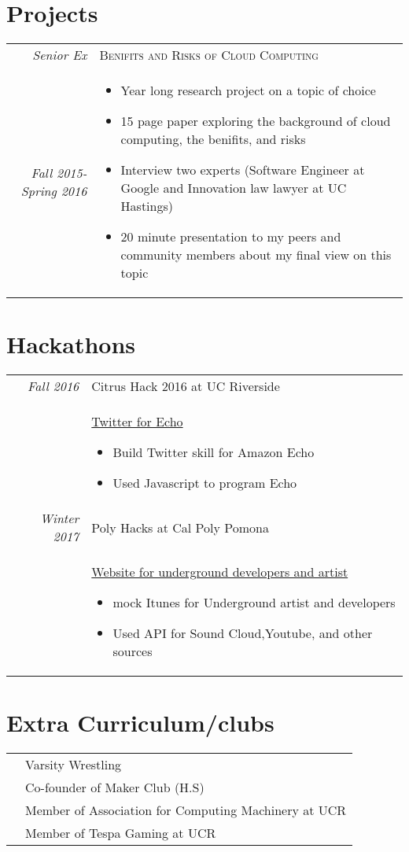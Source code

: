 \documentclass[a4paper,12pt]{article}
\begin{document}
\section{Projects}

\begin{tabular}{r|p{11cm}}
 \emph{Senior Ex} & \textsc{Benifits and Risks of Cloud Computing} \\\emph{Fall 2015-Spring 2016}&\footnotesize\begin{itemize}
  \item Year long research project on a topic of choice
  \item 15 page paper exploring the background of cloud computing, the benifits, and risks
  \item Interview two experts (Software Engineer at Google and Innovation law lawyer at UC Hastings)
  \item 20 minute presentation to my peers and community members about my final view on this topic
\end{itemize}\\


\end{tabular}


\section{Hackathons}
\begin{tabular}{r|p{11cm}}
 \emph{Fall 2016} & Citrus Hack 2016 at UC Riverside\\
    &\href{https://github.com/jluo117/echo_twitter_program}{Twitter for Echo}
 \footnotesize\begin{itemize}
  \item Build Twitter skill for Amazon Echo
  \item Used Javascript to program Echo
\end{itemize}\\
\emph{Winter 2017} & Poly Hacks at Cal Poly Pomona\\
    & \href{https://github.com/jluo117/PolyHacks}{Website for underground developers and artist}
 \footnotesize\begin{itemize}
  \item mock Itunes for Underground artist and developers
  \item Used API for Sound Cloud,Youtube, and other sources
\end{itemize}
\end{tabular}
\section{Extra Curriculum/clubs}
\begin{tabular}{rl}
&Varsity Wrestling \\
&Co-founder of Maker Club (H.S)\\
&Member of Association for Computing Machinery at UCR \\
&Member of Tespa Gaming at UCR\\


\end{tabular}
\end{document}
